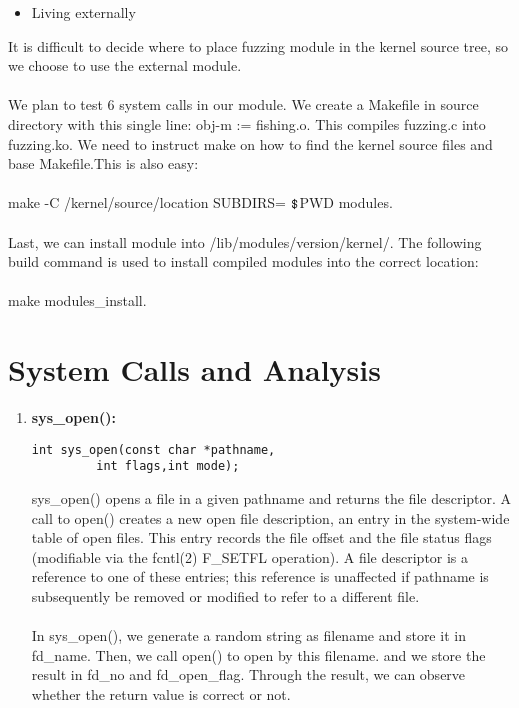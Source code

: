 \documentclass[twoside]{article}
\begin{document}
\begin{multicols}{2}
\begin{itemize}
\item Living externally

\end{itemize}

\noindent
It is difficult to decide where to place fuzzing module in the kernel source tree, so we choose to use the external module. 
\\\\
\noindent
We plan to test 6 system calls in our module. We create a Makefile 	in source directory with this single line: obj-m := fishing.o. This compiles fuzzing.c into fuzzing.ko. We need to instruct make on how to find the kernel source files and base Makefile.This is also easy:
\\\\
\noindent
make -C /kernel/source/location SUBDIRS= \(\verb"$"\)PWD modules.
\\\\
\noindent
Last, we can install module into /lib/modules/version/kernel/. The following build command is used to install compiled modules into the correct location: 
\\\\
\noindent
make modules\_install.



\section{System Calls and Analysis}

\begin{enumerate}

\item
{\bf sys\_open():}
{\footnotesize
\begin{lstlisting}
int sys_open(const char *pathname,
         int flags,int mode);
\end{lstlisting}
\par}

sys\_open() opens a file in a given pathname  and returns the file descriptor. A call to open() creates a new open file description, an entry in the system-wide table of open files. This entry records the file offset and the file status flags (modifiable via the fcntl(2) F\_SETFL operation). A file descriptor is a reference to one of these entries; this reference is unaffected if pathname is subsequently be removed or modified to refer to a different file.  
\\\\
\noindent
In sys\_open(), we generate a random string as filename and store it in fd\_name. Then, we call open() to open by this filename. and we store the result in fd\_no and fd\_open\_flag. Through the result, we can observe whether the return value is correct or not.


\end{enumerate}
\end{multicols}
\end{document}
